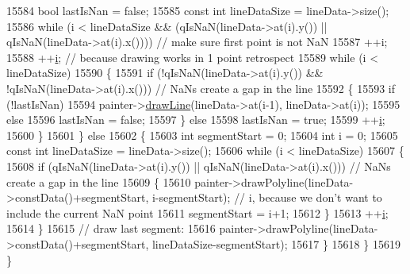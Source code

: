 \begin{DoxyCode}
15584       \textcolor{keywordtype}{bool} lastIsNan = \textcolor{keyword}{false};
15585       \textcolor{keyword}{const} \textcolor{keywordtype}{int} lineDataSize = lineData->size();
15586       \textcolor{keywordflow}{while} (i < lineDataSize && (qIsNaN(lineData->at(i).y()) || qIsNaN(lineData->at(i).x()))) \textcolor{comment}{// make sure
       first point is not NaN}
15587         ++i;
15588       ++\hyperlink{_comparision_pictures_2_createtest_image_8m_a6f6ccfcf58b31cb6412107d9d5281426}{i}; \textcolor{comment}{// because drawing works in 1 point retrospect}
15589       \textcolor{keywordflow}{while} (i < lineDataSize)
15590       \{
15591         \textcolor{keywordflow}{if} (!qIsNaN(lineData->at(i).y()) && !qIsNaN(lineData->at(i).x())) \textcolor{comment}{// NaNs create a gap in the line}
15592         \{
15593           \textcolor{keywordflow}{if} (!lastIsNan)
15594             painter->\hyperlink{class_q_c_p_painter_a0b4b1b9bd495e182c731774dc800e6e0}{drawLine}(lineData->at(i-1), lineData->at(i));
15595           \textcolor{keywordflow}{else}
15596             lastIsNan = \textcolor{keyword}{false};
15597         \} \textcolor{keywordflow}{else}
15598           lastIsNan = \textcolor{keyword}{true};
15599         ++\hyperlink{_comparision_pictures_2_createtest_image_8m_a6f6ccfcf58b31cb6412107d9d5281426}{i};
15600       \}
15601     \} \textcolor{keywordflow}{else}
15602     \{
15603       \textcolor{keywordtype}{int} segmentStart = 0;
15604       \textcolor{keywordtype}{int} i = 0;
15605       \textcolor{keyword}{const} \textcolor{keywordtype}{int} lineDataSize = lineData->size();
15606       \textcolor{keywordflow}{while} (i < lineDataSize)
15607       \{
15608         \textcolor{keywordflow}{if} (qIsNaN(lineData->at(i).y()) || qIsNaN(lineData->at(i).x())) \textcolor{comment}{// NaNs create a gap in the line}
15609         \{
15610           painter->drawPolyline(lineData->constData()+segmentStart, i-segmentStart); \textcolor{comment}{// i, because we don't
       want to include the current NaN point}
15611           segmentStart = i+1;
15612         \}
15613         ++\hyperlink{_comparision_pictures_2_createtest_image_8m_a6f6ccfcf58b31cb6412107d9d5281426}{i};
15614       \}
15615       \textcolor{comment}{// draw last segment:}
15616       painter->drawPolyline(lineData->constData()+segmentStart, lineDataSize-segmentStart);
15617     \}
15618   \}
15619 \}
\end{DoxyCode}


